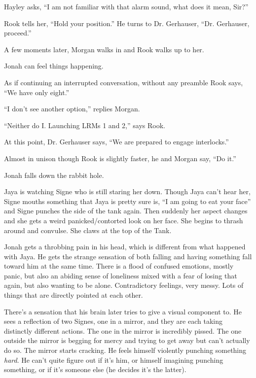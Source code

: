 Hayley asks, ``I am not familiar with that alarm sound, what does it mean, Sir?''

Rook tells her, ``Hold your position.''  He turns to Dr. Gerhauser, ``Dr. Gerhauser, proceed.''

A few moments later, Morgan walks in and Rook walks up to her.

Jonah can feel things happening. 

As if continuing an interrupted conversation, without any preamble Rook says, ``We have only eight.''

``I don't see another option,'' replies Morgan.

``Neither do I.  Launching LRMs 1 and 2,'' says Rook.

At this point, Dr. Gerhauser says, ``We are prepared to engage interlocks.''

Almost in unison though Rook is slightly faster, he and Morgan say, ``Do it.''



Jonah falls down the rabbit hole.





Jaya is watching Signe who is still staring her down.  Though Jaya can't hear her, Signe mouths something that Jaya is pretty sure is, ``I am going to eat your face'' and Signe punches the side of the tank again.  Then suddenly her aspect changes and she gets a weird panicked/contorted look on her face.  She begins to thrash around and convulse.  She claws at the top of the Tank.





Jonah gets a throbbing pain in his head, which is different from what happened with Jaya.  He gets the strange sensation of both falling and having something fall toward him at the same time.  There is a flood of confused emotions, mostly panic, but also an abiding sense of loneliness mixed with a fear of losing that again, but also wanting to be alone.  Contradictory feelings, very messy.  Lots of things that are directly pointed at each other.  



There's a sensation that his brain later tries to give a visual component to.  He sees a reflection of two Signes, one in a mirror, and they are each taking distinctly different actions.  The one in the mirror is incredibly pissed.  The one outside the mirror is begging for mercy and trying to get away but can't actually do so.  The mirror starts cracking.  He feels himself violently punching something \textit{hard}. He can't quite figure out if it's him, or himself imagining punching something, or if it's someone else (he decides it's the latter).




